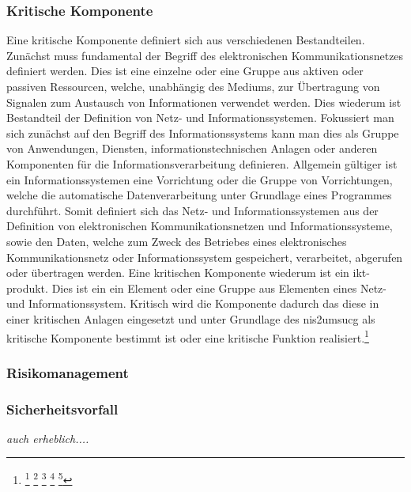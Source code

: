 \documentclass[11pt,a4paper,hidelinks]{article}   %
\begin{document}
            \subsubsection{Kritische Komponente}
            Eine kritische Komponente definiert sich aus verschiedenen Bestandteilen. Zunächst muss fundamental der Begriff des elektronischen Kommunikationsnetzes definiert werden. Dies ist eine einzelne oder eine Gruppe aus aktiven oder passiven Ressourcen, welche, unabhängig des Mediums, zur Übertragung von Signalen zum Austausch von Informationen verwendet werden. Dies wiederum ist Bestandteil der Definition von Netz- und Informationssystemen. Fokussiert man sich zunächst auf den Begriff des Informationssystems kann man dies als Gruppe von Anwendungen, Diensten, informationstechnischen Anlagen oder anderen Komponenten für die Informationsverarbeitung definieren. Allgemein gültiger ist ein Informationssystemen eine Vorrichtung oder die Gruppe von Vorrichtungen, welche die automatische Datenverarbeitung unter Grundlage eines Programmes durchführt. Somit definiert sich das Netz- und Informationssystemen aus der Definition von elektronischen Kommunikationsnetzen und Informationssysteme, sowie den Daten, welche zum Zweck des Betriebes eines elektronisches Kommunikationsnetz oder Informationssystem gespeichert, verarbeitet, abgerufen oder übertragen werden. Eine kritischen Komponente wiederum ist ein \gls{ikt-produkt}. Dies ist ein ein Element oder eine Gruppe aus Elementen eines Netz- und Informationssystem. Kritisch wird die Komponente dadurch das diese in einer kritischen Anlagen eingesetzt und unter Grundlage des \gls{nis2umsucg} als kritische Komponente bestimmt ist oder eine kritische Funktion realisiert.\footnote{
                \footcite[Vgl.][, §2 Nummer 23]{NIS2UmsuCG}
                \footcite[Vgl.][, Artikel 4, Nummer 1]{EU2016-1148}
                \footcite[Vgl.][, Artikel 2, Buchstabe a]{EU2002-21-EG}
                \footcite[Vgl.][, Artikel 2, Nummer 12]{EU2019-881}
                \footcite[Vgl.][, S. 5]{iso27000-2018}
            }

            \subsubsection{Risikomanagement}

            \subsubsection{Sicherheitsvorfall}
            \emph{auch erheblich....}
\end{document}
